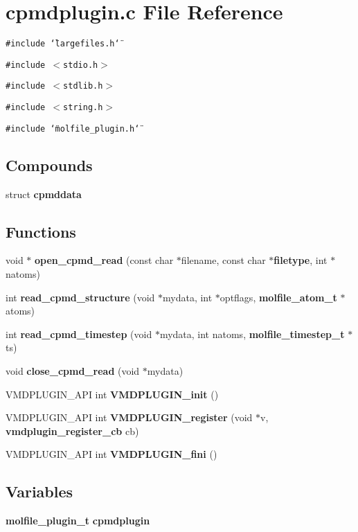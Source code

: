 \section{cpmdplugin.c File Reference}
\label{cpmdplugin_8c}
{\tt \#include \char`\"{}largefiles.h\char`\"{}}\par
{\tt \#include $<$stdio.h$>$}\par
{\tt \#include $<$stdlib.h$>$}\par
{\tt \#include $<$string.h$>$}\par
{\tt \#include \char`\"{}molfile\_\-plugin.h\char`\"{}}\par
\subsection*{Compounds}
\begin{CompactItemize}
\item 
struct {\bf cpmddata}
\end{CompactItemize}
\subsection*{Functions}
\begin{CompactItemize}
\item 
void $\ast$ {\bf open\_\-cpmd\_\-read} (const char $\ast$filename, const char $\ast${\bf filetype}, int $\ast$natoms)
\item 
int {\bf read\_\-cpmd\_\-structure} (void $\ast$mydata, int $\ast$optflags, {\bf molfile\_\-atom\_\-t} $\ast$atoms)
\item 
int {\bf read\_\-cpmd\_\-timestep} (void $\ast$mydata, int natoms, {\bf molfile\_\-timestep\_\-t} $\ast$ts)
\item 
void {\bf close\_\-cpmd\_\-read} (void $\ast$mydata)
\item 
VMDPLUGIN\_\-API int {\bf VMDPLUGIN\_\-init} ()
\item 
VMDPLUGIN\_\-API int {\bf VMDPLUGIN\_\-register} (void $\ast$v, {\bf vmdplugin\_\-register\_\-cb} cb)
\item 
VMDPLUGIN\_\-API int {\bf VMDPLUGIN\_\-fini} ()
\end{CompactItemize}
\subsection*{Variables}
\begin{CompactItemize}
\item 
{\bf molfile\_\-plugin\_\-t} {\bf cpmdplugin}
\end{CompactItemize}


